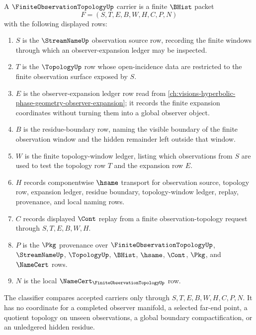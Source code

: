 \begin{definition}
\label{def:finite-observation-topology-carrier}
A $\FiniteObservationTopologyUp$ carrier is a finite $\BHist$ packet
$$
F=(S,T,E,B,W,H,C,P,N)
$$
with the following displayed rows:
\begin{enumerate}
\item $S$ is the $\StreamNameUp$ observation source row, recording the finite windows through which an observer-expansion ledger may be inspected.
\item $T$ is the $\TopologyUp$ row whose open-incidence data are restricted to the finite observation surface exposed by $S$.
\item $E$ is the observer-expansion ledger row read from \autoref{ch:visions-hyperbolic-phase-geometry-observer-expansion}; it records the finite expansion coordinates without turning them into a global observer object.
\item $B$ is the residue-boundary row, naming the visible boundary of the finite observation window and the hidden remainder left outside that window.
\item $W$ is the finite topology-window ledger, listing which observations from $S$ are used to test the topology row $T$ and the expansion row $E$.
\item $H$ records componentwise $\hsame$ transport for observation source, topology row, expansion ledger, residue boundary, topology-window ledger, replay, provenance, and local naming rows.
\item $C$ records displayed $\Cont$ replay from a finite observation-topology request through $S,T,E,B,W,H$.
\item $P$ is the $\Pkg$ provenance over $\FiniteObservationTopologyUp$, $\StreamNameUp$, $\TopologyUp$, $\BHist$, $\hsame$, $\Cont$, $\Pkg$, and $\NameCert$ rows.
\item $N$ is the local $\NameCert_{\FiniteObservationTopologyUp}$ row.
\end{enumerate}
The classifier compares accepted carriers only through $S,T,E,B,W,H,C,P,N$. It has no coordinate for a completed observer manifold, a selected far-end point, a quotient topology on unseen observations, a global boundary compactification, or an unledgered hidden residue.
\end{definition}

